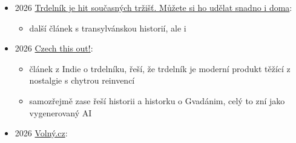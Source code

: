 \begin{itemize}
  \begin{itemize}
  \tightlist
  \item
    youtube kanál \emph{Brevia Culinae}
  \item
    video používá AI obrázky, nejspíš AI hlasy a rozhodně AI příběh,
    protože obsahuje vážně zajímavý tvrzení
  \item
    začínají nadějně, říkají, že podobný pokrmy jsou starodávný a jsou
    známý po celý střední Evropě, pak už to jde z kopce
  \item
    příběh o Gvadánim je prej potvrzenej v jeho pamětech, kde píše, že
    jeho kuchař peče pečivo na roštu (kde ty paměti jsou?)
  \item
    kuchař se prej jmenoval Josef Schill (zhruba, jméno jsem jen
    odposlechl). To jsem nikdy nikde neviděl.
  \item
    popis pečení je pak stejnej jako u kurtoskalácse, ještě tam
    rozebírají, jak cukr má karamelizovat. Což teda samozřejmě u
    původního trdelníku nemá, ale u moderního se to někdy děje.
  \item
    pak mluví o PGI
  \end{itemize}
\item
  2026
  \href{https://plzenoviny.cz/trdelnik-je-hit-soucasnych-trzist-muzete-si-jej-udelat-snadno-i-doma/}{Trdelník
  je hit současných tržišť. Můžete si ho udělat snadno i doma}:

  \begin{itemize}
  \tightlist
  \item
    další článek s transylvánskou historií, ale i 
  \end{itemize}
\item
  2026
  \href{https://www.deccanherald.com/lifestyle/food-and-drink/czech-this-out-3864258}{Czech
  this out!}:

  \begin{itemize}
  \tightlist
  \item
    článek z Indie o trdelníku, řeší, že trdelník je moderní produkt
    těžící z nostalgie s chytrou reinvencí
  \item
    samozřejmě zase řeší historii a historku o Gvadánim, celý to zní
    jako vygenerovaný AI
  \end{itemize}
\item
  2026
  \href{https://volny.centrum.cz/cesi-to-povazuji-za-narodni-tradici-ale-jeho-puvod-byste-v-cesku-hledali-marne-e0655b93-83c0-54de-a7dc-59fbaab37c0a}{Volný.cz}:


\end{itemize}
